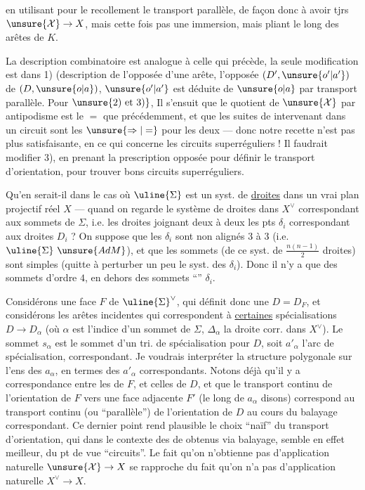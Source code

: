 en utilisant pour le recollement le
transport parallèle, de façon donc
à avoir tjrs $\unsure{\mathcal X}\to X$, mais
cette fois pas une immersion,
mais   pliant
le long des arêtes de $K$.

La description combinatoire
est analogue à celle qui
précède, la seule modification
est dans 1) (description de
l'opposée d'une arête,  
l'opposée $(D',\unsure{o'|a'})$ de $(D,\unsure{o|a})$, $\unsure{o'|a'}$ est
déduite de $\unsure{o|a}$ par transport
parallèle. Pour $\unsure{2)\ \text{et}\ 3)}$, 
Il s'ensuit que le quotient de
$\unsure{\mathcal X}$ par antipodisme est le $=$ que
précédemment, et que les suites de
 intervenant dans un circuit
sont les  $\unsure{\Rightarrow|=}$ pour les deux --- donc
notre recette n'est pas plus satisfaisante,
en ce qui concerne les circuits
superréguliers ! Il faudrait modifier
3), en prenant la prescription opposée
pour définir le transport d'orientation,
pour trouver  bons circuits
superréguliers.

Qu'en serait-il dans le cas
où $\uline{\Sigma}$ est un syst. de \uline{droites} dans un
vrai plan projectif réel $X$ --- quand on regarde
le système de droites dans $X^\vee$ correspondant
aux sommets de $\Sigma$, i.e. les droites joignant
deux à deux les pts $\delta_i$ correspondant aux
droites $D_i$ ? On suppose  que les $\delta_i$ sont non
alignés $3$ à $3$ (i.e. $\uline{\Sigma}\ \unsure{AdM}$), et que
les sommets  (de ce syst. de
$\frac{n(n-1)}2$ droites) sont simples (quitte
à perturber un peu le syst. des
$\delta_i$). Donc il n'y a que des
sommets d'ordre $4$, en dehors des
sommets ``'' $\delta_i$.

Considérons une face $F$ de $\uline{\Sigma}^\vee$,
qui définit donc une 
$D=D_F$, et considérons les
arêtes incidentes  qui correspondent
à \uline{certaines} spécialisations
$D\to D_\alpha$ (où $\alpha$ est l'indice d'un
sommet de $\Sigma$, $\Delta_\alpha$ la droite
corr. dans $X^\vee$). Le sommet
$s_\alpha$ est le sommet d'un
tri. de spécialisation pour $D$,
soit $a'_\alpha$ l'arc de spécialisation,
correspondant. Je voudrais
interpréter la structure polygonale sur
l'ens des $a_\alpha$, en termes des $a'_\alpha$
correspondants. Notons déjà qu'il y
a correspondance entre les  
de $F$, et celles de $D$, et que le
transport continu de l'orientation de
$F$ vers une face adjacente $F'$
(le long de $a_\alpha$ disons) correspond au
transport continu (ou ``parallèle'') de
l'orientation de $D$ au cours du balayage
correspondant.  Ce dernier point
rend plausible le choix ``naïf'' du
transport d'orientation, qui dans le contexte
des  de  obtenus via balayage,
semble en effet meilleur, du pt de
vue ``circuits''. Le fait qu'on n'obtienne
pas d'application naturelle $\unsure{\mathcal X}\to X$ se
rapproche du fait qu'on n'a pas d'application
naturelle $X^\vee\to X$.

